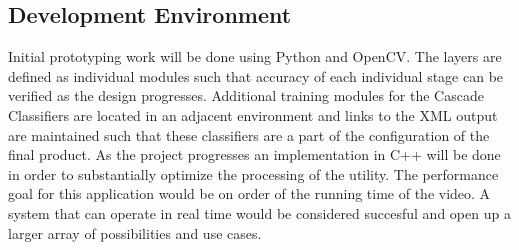 \subsection{Development Environment}
Initial prototyping work will be done using Python and OpenCV.
The layers are defined as individual modules such that accuracy of each individual stage can be verified as the design progresses.
Additional training modules for the Cascade Classifiers are located in an adjacent environment
and links to the XML output are maintained such that these classifiers are a part of the configuration of the final product.
As the project progresses an implementation in C++ will be done in order to substantially optimize the processing of the utility.
The performance goal for this application would be on order of the running time of the video.
A system that can operate in real time would be considered succesful and open up a larger array of possibilities and use cases.

